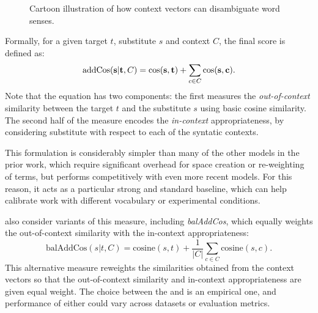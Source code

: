 \begin{figure}
\centering
{}
\caption{Cartoon illustration of how context vectors can disambiguate word senses.}
\label{fig:substitution}
\end{figure}

Formally, for a given target $t$, substitute $s$ and context $C$, the final
{\addCos} score is defined as:
\begin{equation}
  \text{addCos}({\mathbf{s}}|{\mathbf{t}},C) = \text{cos}({\mathbf{s}}, {\mathbf{t}}) + \sum_{c\in C} \text{cos}({\mathbf{s}}, {\mathbf{c}}).
\end{equation}
Note that the equation has two components: the first measures the {\em
out-of-context} similarity between the target $t$ and the substitute $s$ using
basic cosine similarity. The second half of the measure encodes the {\em
in-context} appropriateness, by considering substitute with respect to
each of the syntatic contexts.

This formulation is considerably simpler than many of the other models
in the prior work, which require significant overhead for space creation
or re-weighting of terms, but performs competitively with even more recent
models. For this reason, it acts as a particular strong and standard baseline,
which can help calibrate work with different vocabulary or experimental
conditions.

 also consider variants of this measure, including
{\em balAddCos}, which equally weights the out-of-context similarity with the
in-context appropriateness:
\begin{equation}
  \text{balAddCos}(s|t,C) = \text{cosine}(s, t) + \frac{1}{|C|}\sum_{c\in C} \text{cosine}(s, c).
\end{equation}
This alternative measure reweights the similarities obtained from the context
vectors so that the out-of-context similarity and in-context appropriateness
are given equal weight. The choice between the \addCos and \balAddCos is
an empirical one, and performance of either could vary across datasets or
evaluation metrics.

